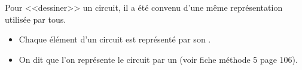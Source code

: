 \begin{mybilan}
	
	Pour <<dessiner>> un circuit, il a été convenu d'une même représentation utilisée par tous.\pause
	
	\begin{itemize}
		\item Chaque élément d'un circuit est représenté par son .\pause
		\item On dit que l'on représente le circuit par un  (voir fiche méthode 5 page 106). 
	\end{itemize}
\end{mybilan}